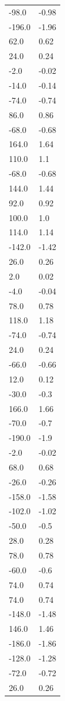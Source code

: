 \begin{longtable}{ll}
-98.0 & -0.98 \\
-196.0 & -1.96 \\
62.0 & 0.62 \\
24.0 & 0.24 \\
-2.0 & -0.02 \\
-14.0 & -0.14 \\
-74.0 & -0.74 \\
86.0 & 0.86 \\
-68.0 & -0.68 \\
164.0 & 1.64 \\
110.0 & 1.1 \\
-68.0 & -0.68 \\
144.0 & 1.44 \\
92.0 & 0.92 \\
100.0 & 1.0 \\
114.0 & 1.14 \\
-142.0 & -1.42 \\
26.0 & 0.26 \\
2.0 & 0.02 \\
-4.0 & -0.04 \\
78.0 & 0.78 \\
118.0 & 1.18 \\
-74.0 & -0.74 \\
24.0 & 0.24 \\
-66.0 & -0.66 \\
12.0 & 0.12 \\
-30.0 & -0.3 \\
166.0 & 1.66 \\
-70.0 & -0.7 \\
-190.0 & -1.9 \\
-2.0 & -0.02 \\
68.0 & 0.68 \\
-26.0 & -0.26 \\
-158.0 & -1.58 \\
-102.0 & -1.02 \\
-50.0 & -0.5 \\
28.0 & 0.28 \\
78.0 & 0.78 \\
-60.0 & -0.6 \\
74.0 & 0.74 \\
74.0 & 0.74 \\
-148.0 & -1.48 \\
146.0 & 1.46 \\
-186.0 & -1.86 \\
-128.0 & -1.28 \\
-72.0 & -0.72 \\
26.0 & 0.26 \\

\end{longtable}
